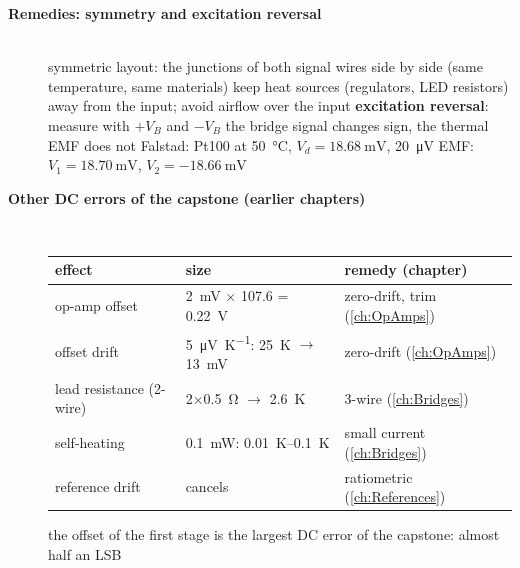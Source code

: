 \begin{description}
\item[{\rot\bf Remedies: symmetry and excitation reversal}]~\\[-\lblskip]
\bi
	\ite symmetric layout: the junctions of both signal wires side by side (same temperature, same materials)
	\ite keep heat sources (regulators, LED resistors) away from the input; avoid airflow over the input
	\ite \textbf{excitation reversal}: measure with $+V_B$ and $-V_B$
	\itee the bridge signal changes sign, the thermal EMF does not
\ei
{}
\bi
	\ite Falstad: Pt100 at \SI{50}{\celsius}, $V_d = \SI{18.68}{\milli\volt}$, \SI{20}{\micro\volt} EMF: $V_1 = \SI{18.70}{\milli\volt}$, $V_2 = \SI{-18.66}{\milli\volt}$
\ei
{}\par
{}
\os{\newpage}

\item[{\rot\bf Other DC errors of the capstone (earlier chapters)}]~\\[-\lblskip]
\begin{center}
\begin{tabular}{lll}
\toprule
effect & size & remedy (chapter) \\
\midrule
op-amp offset & \SI{2}{\milli\volt} $\times$ 107.6 = \SI{0.22}{\volt} & zero-drift, trim (\ref{ch:OpAmps}) \\
offset drift & \SI{5}{\micro\volt\per\kelvin}: \SI{25}{\kelvin} $\rightarrow$ \SI{13}{\milli\volt} & zero-drift (\ref{ch:OpAmps}) \\
lead resistance (2-wire) & \SI{2}{}$\times$\SI{0.5}{\ohm} $\rightarrow$ \SI{2.6}{\kelvin} & 3-wire (\ref{ch:Bridges}) \\
self-heating & \SI{0.1}{\milli\watt}: \SIrange{0.01}{0.1}{\kelvin} & small current (\ref{ch:Bridges}) \\
reference drift & cancels & ratiometric (\ref{ch:References}) \\
\bottomrule
\end{tabular}
\end{center}
\bi
	\ite the offset of the first stage is the largest DC error of the capstone: almost half an LSB
\ei
\os{\newpage}
\end{description}

